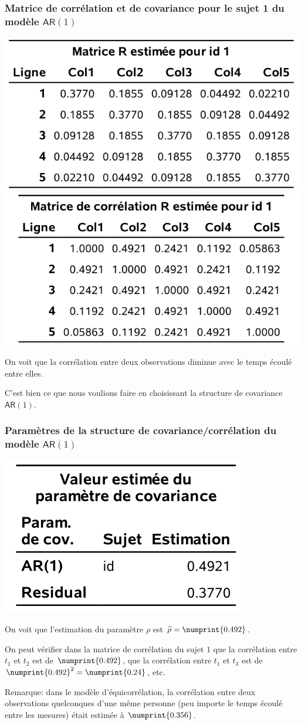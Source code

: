 \documentclass{beamer}
\begin{document}
\begin{frame}[fragile]
\frametitle{Matrice de corrélation et de covariance pour le sujet 1 du modèle $\mathsf{AR}(1)$}
\begin{center}
\includegraphics[width = 0.45\linewidth]{img/c5/diapos6-e15a}
\includegraphics[width = 0.45\linewidth]{img/c5/diapos6-e15b}
\end{center}
\bi
\item On voit que la corrélation entre deux observations diminue avec le temps écoulé entre elles. 
\item C'est bien ce que nous voulions faire en choisissant la structure de covariance $\mathsf{AR}(1)$.
\ei
\end{frame}

\begin{frame}[fragile]
\frametitle{Paramètres de la structure de covariance/corrélation du modèle $\mathsf{AR}(1)$}
\begin{center}
\includegraphics[width = 0.4\linewidth]{img/c5/diapos6-e16}
\end{center}
\bi
\item On voit que l'estimation
du paramètre $\rho$ est $\hat{\rho}= \numprint{0.492}$. 
\item On peut vérifier dans la matrice de corrélation du sujet $1$ que la corrélation entre $t_1$ et $t_2$ est de $ \numprint{0.492}$, que la corrélation entre $t_1$ et $t_3$ est de $ \numprint{0.492}^2= \numprint{0.24}$, etc.
\item Remarque:  dans le modèle d'équicorrélation, la corrélation entre deux
observations quelconques d'une même personne (peu importe le temps
écoulé entre les mesures) était estimée à $ \numprint{0.356}$. 

\ei
\end{frame}
\end{document}

